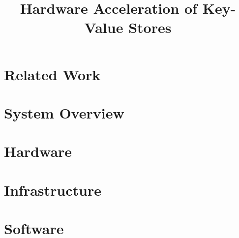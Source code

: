 \documentclass[conference]{IEEEtran}
\title{Hardware Acceleration of Key-Value Stores}
\author{
	\IEEEauthorblockN{Howard Mao}
	\IEEEauthorblockA{\email{zhemao@eecs.berkeley.edu}}
	\and
	\IEEEauthorblockN{Sagar Karandikar}
	\IEEEauthorblockA{\email{skarandikar@berkeley.edu}}
	\and
	\IEEEauthorblockN{Albert Ou}
	\IEEEauthorblockA{\email{aou@eecs.berkeley.edu}}
	\and
	\IEEEauthorblockN{Soumya Basu}
	\IEEEauthorblockA{\email{soumyab@berkeley.edu}}
}
\begin{document}
\maketitle




\section{Related Work}



\section{System Overview}



\section{Hardware}




\section{Infrastructure}



\section{Software}



\nocite{*}
\printbibliography
\end{document}
